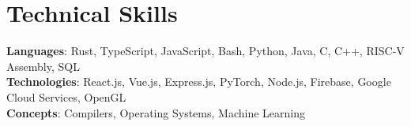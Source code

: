 \section{Technical Skills}
    \begin{itemize}[leftmargin=0.15in, label={}]
	\small{\item{
		\textbf{Languages}{: Rust, TypeScript, JavaScript, Bash, Python, Java, C, C++, RISC-V Assembly, SQL} \\
		\textbf{Technologies}{: React.js, Vue.js, Express.js, PyTorch, Node.js, Firebase, Google Cloud Services, OpenGL} \\
		\textbf{Concepts}{: Compilers, Operating Systems, Machine Learning}
	}}
    \end{itemize}